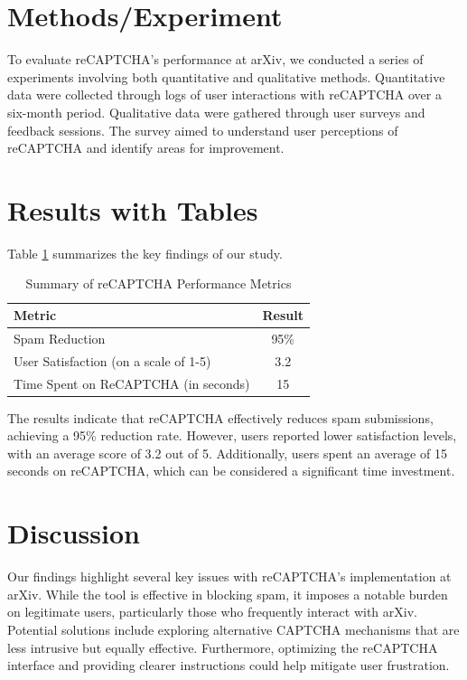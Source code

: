 \section{Methods/Experiment}
To evaluate reCAPTCHA’s performance at arXiv, we conducted a series of experiments involving both quantitative and qualitative methods. Quantitative data were collected through logs of user interactions with reCAPTCHA over a six-month period. Qualitative data were gathered through user surveys and feedback sessions. The survey aimed to understand user perceptions of reCAPTCHA and identify areas for improvement.

\section{Results with Tables}
Table \ref{tab:results} summarizes the key findings of our study.

\begin{table}[htbp]
\centering
\begin{tabular}{|l|c|}
\hline
\textbf{Metric} & \textbf{Result} \\
\hline
Spam Reduction & 95\% \\
User Satisfaction (on a scale of 1-5) & 3.2 \\
Time Spent on ReCAPTCHA (in seconds) & 15 \\
\hline
\end{tabular}
\caption{Summary of reCAPTCHA Performance Metrics}
\label{tab:results}
\end{table}

The results indicate that reCAPTCHA effectively reduces spam submissions, achieving a 95\% reduction rate. However, users reported lower satisfaction levels, with an average score of 3.2 out of 5. Additionally, users spent an average of 15 seconds on reCAPTCHA, which can be considered a significant time investment.

\section{Discussion}
Our findings highlight several key issues with reCAPTCHA’s implementation at arXiv. While the tool is effective in blocking spam, it imposes a notable burden on legitimate users, particularly those who frequently interact with arXiv. Potential solutions include exploring alternative CAPTCHA mechanisms that are less intrusive but equally effective. Furthermore, optimizing the reCAPTCHA interface and providing clearer instructions could help mitigate user frustration.

